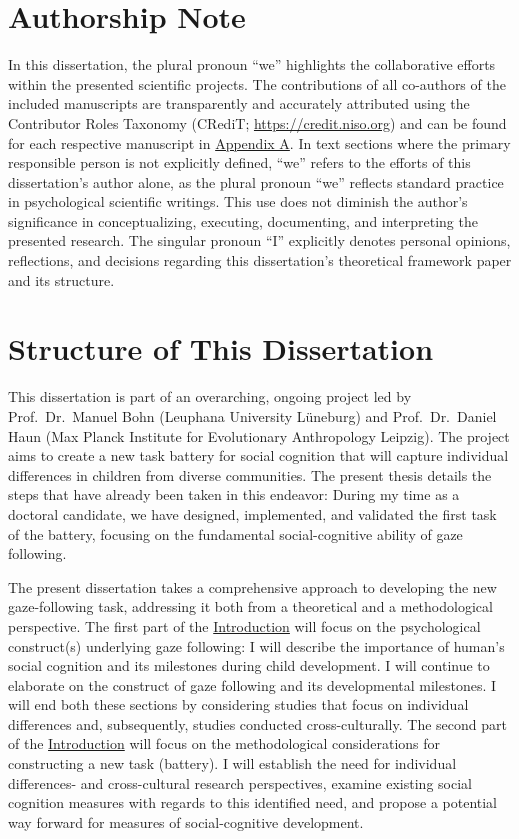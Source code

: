\documentclass[
]{scrbook}
\begin{document}
\chapter*{Authorship Note}\label{authorship}

In this dissertation, the plural pronoun ``we'' highlights the collaborative efforts within the presented scientific projects. The contributions of all co-authors of the included manuscripts are transparently and accurately attributed using the Contributor Roles Taxonomy (CRediT; \mbox{\url{https://credit.niso.org}}) and can be found for each respective manuscript in \hyperref[appendixA]{Appendix A}. In text sections where the primary responsible person is not explicitly defined, ``we'' refers to the efforts of this dissertation's author alone, as the plural pronoun ``we'' reflects standard practice in psychological scientific writings. This use does not diminish the author's significance in conceptualizing, executing, documenting, and interpreting the presented research. The singular pronoun ``I'' explicitly denotes personal opinions, reflections, and decisions regarding this dissertation's theoretical framework paper and its structure.

\chapter*{Structure of This Dissertation}\label{structure}

This dissertation is part of an overarching, ongoing project led by Prof.~Dr.~Manuel Bohn (Leuphana University Lüneburg) and Prof.~Dr.~Daniel Haun (Max Planck Institute for Evolutionary Anthropology Leipzig). The project aims to create a new task battery for social cognition that will capture individual differences in children from diverse communities. The present thesis details the steps that have already been taken in this endeavor: During my time as a doctoral candidate, we have designed, implemented, and validated the first task of the battery, focusing on the fundamental social-cognitive ability of gaze following.

The present dissertation takes a comprehensive approach to developing the new gaze-following task, addressing it both from a theoretical and a methodological perspective. The first part of the \hyperref[introduction]{Introduction} will focus on the psychological construct(s) underlying gaze following: I will describe the importance of human's social cognition and its milestones during child development. I will continue to elaborate on the construct of gaze following and its developmental milestones. I will end both these sections by considering studies that focus on individual differences and, subsequently, studies conducted cross-culturally. The second part of the \hyperref[introduction]{Introduction} will focus on the methodological considerations for constructing a new task (battery). I will establish the need for individual differences- and cross-cultural research perspectives, examine existing social cognition measures with regards to this identified need, and propose a potential way forward for measures of social-cognitive development.
\end{document}

